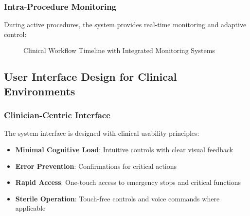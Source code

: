\subsubsection{Intra-Procedure Monitoring}
During active procedures, the system provides real-time monitoring and adaptive control:

\begin{figure}[htbp]
\centering
{}
\caption{Clinical Workflow Timeline with Integrated Monitoring Systems}
\label{fig:clinical-workflow}
\end{figure}

\subsection{User Interface Design for Clinical Environments}

\subsubsection{Clinician-Centric Interface}
The system interface is designed with clinical usability principles:

\begin{itemize}
    \item \textbf{Minimal Cognitive Load}: Intuitive controls with clear visual feedback
    \item \textbf{Error Prevention}: Confirmations for critical actions
    \item \textbf{Rapid Access}: One-touch access to emergency stops and critical functions
    \item \textbf{Sterile Operation}: Touch-free controls and voice commands where applicable
\end{itemize}

